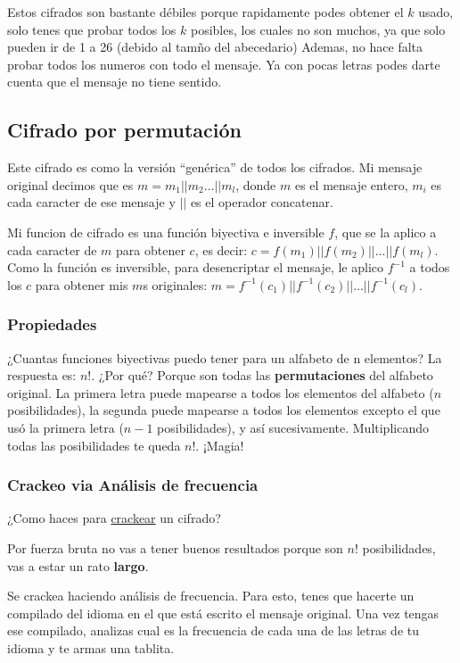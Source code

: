 \documentclass[12pt,a4paper]{report}
\begin{document}
Estos cifrados son bastante débiles porque rapidamente podes obtener el $k$ usado, solo tenes que probar todos los $k$ posibles, los cuales no son muchos, ya que solo pueden ir de 1 a 26 (debido al tamño del abecedario)
Ademas, no hace falta probar todos los numeros con todo el mensaje. Ya con pocas letras podes darte cuenta que el mensaje no tiene sentido.

\subsection{Cifrado por permutación}

Este cifrado es como la versión ``genérica'' de todos los cifrados.
Mi mensaje original decimos que es $m = m_1 || m_2 \dots || m_l$, donde $m$ es el mensaje entero, $m_i$ es cada caracter de ese mensaje y $||$ es el operador concatenar.


Mi funcion de cifrado es una función biyectiva e inversible $f$, que se la aplico a cada caracter de $m$ para obtener $c$, es decir: $c = f(m_1) || f(m_2) || \dots || f(m_l)$.
Como la función es inversible, para desencriptar el mensaje, le aplico $f^{-1}$ a todos los $c$ para obtener mis $m$s originales:
$m = f^{-1}(c_1) || f^{-1}(c_2) || \dots || f^{-1}(c_l)$.

\subsubsection{Propiedades}
¿Cuantas funciones biyectivas puedo tener para un alfabeto de n elementos?
La respuesta es: $n!$. ¿Por qué? Porque son todas las \textbf{permutaciones} del alfabeto original.
La primera letra puede mapearse a todos los elementos del alfabeto ($n$ posibilidades), la segunda puede mapearse a todos los elementos excepto el que usó la primera letra ($n -1$ posibilidades), y así sucesivamente. Multiplicando todas las posibilidades te queda $n!$. ¡Magia!

\subsubsection{Crackeo via Análisis de frecuencia}

¿Como haces para \href{https://youtu.be/oozWzypjmqk}{crackear} un cifrado?

Por fuerza bruta no vas a tener buenos resultados porque son $n!$ posibilidades, vas a estar un rato \textbf{largo}.

Se crackea haciendo análisis de frecuencia.
Para esto, tenes que hacerte un compilado del idioma en el que está escrito el mensaje original. Una vez tengas ese compilado, analizas cual es la frecuencia de cada una de las letras de tu idioma y te armas una tablita.
\end{document}
